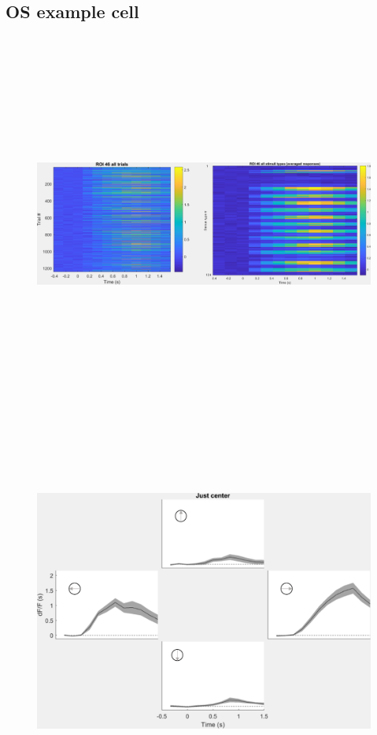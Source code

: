 \subsection{OS example cell}

\begin{figure}[H] \centering \includegraphics[width=12.5cm,height=12.5cm,keepaspectratio]{Figures/7.Results/individualSM/roi 46 mf379 pos2/roi46.png} 
\end{figure}

\begin{figure}[H] \centering \includegraphics[width=12.5cm,height=12.5cm,keepaspectratio]{Figures/7.Results/individualSM/roi 46 mf379 pos2/center.png} 
\end{figure}

